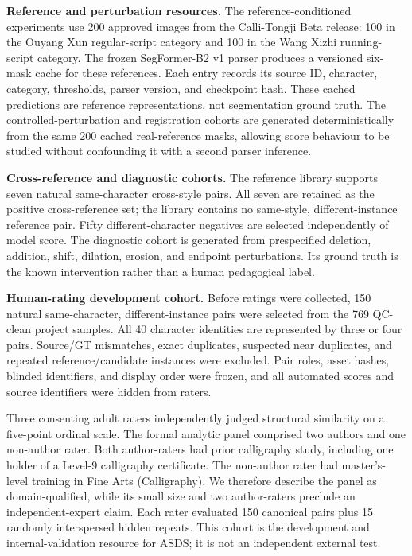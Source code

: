 \medskip
\noindent\textbf{Reference and perturbation resources.}
The reference-conditioned experiments use 200 approved images from the
Calli-Tongji Beta release: 100 in the Ouyang Xun regular-script category and
100 in the Wang Xizhi running-script category. The frozen SegFormer-B2 v1
parser produces a versioned six-mask cache for these references. Each entry
records its source ID, character, category, thresholds, parser version, and
checkpoint hash. These cached predictions are reference representations, not
segmentation ground truth. The controlled-perturbation and registration
cohorts are generated deterministically from the same 200 cached
real-reference masks, allowing score behaviour to be studied without
confounding it with a second parser inference.

\medskip
\noindent\textbf{Cross-reference and diagnostic cohorts.}
The reference library supports seven natural same-character cross-style
pairs. All seven are retained as the positive cross-reference set; the
library contains no same-style, different-instance reference pair. Fifty
different-character negatives are selected independently of model score.
The diagnostic cohort is generated from prespecified deletion, addition,
shift, dilation, erosion, and endpoint perturbations. Its ground truth is the
known intervention rather than a human pedagogical label.

\medskip
\noindent\textbf{Human-rating development cohort.}
\label{sec:original-human}
Before ratings were collected, 150 natural same-character,
different-instance pairs were selected from the 769 QC-clean project samples.
All 40 character identities are represented by three or four pairs. Source/GT
mismatches, exact duplicates, suspected near duplicates, and repeated
reference/candidate instances were excluded. Pair roles, asset hashes,
blinded identifiers, and display order were frozen, and all automated scores
and source identifiers were hidden from raters.

Three consenting adult raters independently judged structural similarity on a
five-point ordinal scale. The formal analytic panel comprised two authors and
one non-author rater. Both author-raters had prior calligraphy study, including
one holder of a Level-9 calligraphy certificate. The non-author rater had
master's-level training in Fine Arts (Calligraphy). We therefore describe the
panel as domain-qualified, while its small size and two author-raters preclude
an independent-expert claim. Each rater evaluated 150 canonical pairs plus 15
randomly interspersed hidden repeats. This cohort is the development and
internal-validation resource for ASDS; it is not an independent external test.

